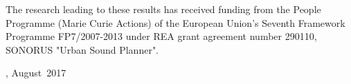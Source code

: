 The research leading to these results has received funding from
the People Programme (Marie Curie Actions) of the European Union's Seventh
Framework Programme FP7/2007-2013 under REA grant agreement number 290110,
SONORUS "Urban Sound Planner".

\vskip 2pc

\noindent \thesisauthor

\noindent \thesiscity, August\  2017  %

